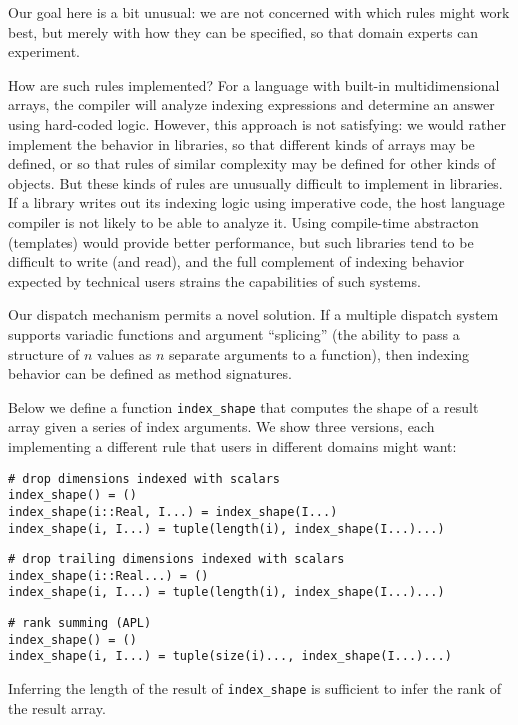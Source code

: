Our goal here is a bit unusual: we are not concerned with which rules
might work best, but merely with how they can be specified, so that
domain experts can experiment.

How are such rules implemented? For a
language with built-in multidimensional arrays, the compiler will
analyze indexing expressions and determine an answer using hard-coded
logic. However, this approach is not satisfying: we would rather
implement the behavior in libraries, so that different kinds of arrays
may be defined, or so that rules of similar complexity may be
defined for other kinds of objects. But these kinds of rules are
unusually difficult to implement in libraries. If a library writes out
its indexing logic using imperative code, the host language compiler
is not likely to be able to analyze it. Using compile-time abstracton
(templates) would provide better performance, but such libraries tend
to be difficult to write (and read), and the full complement of
indexing behavior expected by technical users strains the capabilities
of such systems.

Our dispatch mechanism permits a novel solution. If a multiple dispatch
system supports variadic functions and argument ``splicing'' (the ability
to pass a structure of $n$ values as $n$ separate arguments to a function),
then indexing behavior can be defined as method signatures.

Below we define a function \texttt{index\_shape} that computes the
shape of a result array given a series of index arguments. We show
three versions, each implementing a different rule that users in
different domains might want:

\begin{verbatim}
# drop dimensions indexed with scalars
index_shape() = ()
index_shape(i::Real, I...) = index_shape(I...)
index_shape(i, I...) = tuple(length(i), index_shape(I...)...)
\end{verbatim}

\begin{verbatim}
# drop trailing dimensions indexed with scalars
index_shape(i::Real...) = ()
index_shape(i, I...) = tuple(length(i), index_shape(I...)...)
\end{verbatim}

\begin{verbatim}
# rank summing (APL)
index_shape() = ()
index_shape(i, I...) = tuple(size(i)..., index_shape(I...)...)
\end{verbatim}

Inferring the length of the result of \texttt{index\_shape} is sufficient
to infer the rank of the result array.


